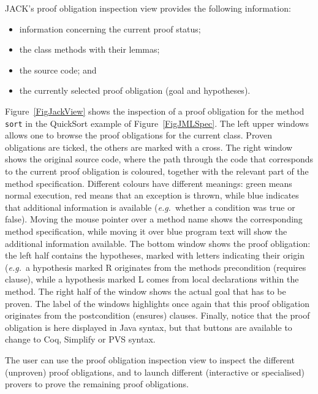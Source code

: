 JACK's proof obligation inspection view provides the following information:
\begin{itemize}
\item information concerning the current proof status;
\item the class methods with their lemmas;
\item the source code; and
\item the currently selected proof obligation (goal and hypotheses).
\end{itemize}
Figure~\ref{FigJackView} shows the inspection of a proof obligation
for the method \texttt{sort} in the QuickSort example of
Figure~\ref{FigJMLSpec}. The left upper windows allows one to browse
the proof obligations for the current class. Proven obligations are
ticked, the others are marked with a cross. The right window shows the
original source code, where the path through the code that corresponds
to the current proof obligation is coloured, together with the
relevant part of the method specification. Different colours have
different meanings: green means normal execution, red means that an
exception is thrown, while blue indicates that additional information
is available (\emph{e.g.}\ whether a condition was true or false).
Moving the mouse pointer over a method name shows the corresponding
method specification, while moving it over blue program text will show
the additional information available. The bottom window shows the
proof obligation: the left half contains the hypotheses, marked with
letters indicating their origin (\emph{e.g.}\ a hypothesis marked R
originates from the methods precondition (requires clause), while a
hypothesis marked L comes from local declarations within the
method. The right half of the window shows the actual goal that has to
be proven. The label of the windows highlights once again that this
proof obligation originates from the postcondition (ensures)
clauses. Finally, notice that the proof obligation is here displayed
in Java syntax, but that buttons are available to change to Coq,
Simplify or PVS syntax.


The user can use the proof obligation inspection view to inspect the
different (unproven) proof obligations, and to launch different
(interactive or specialised) provers to prove the remaining proof
obligations.

